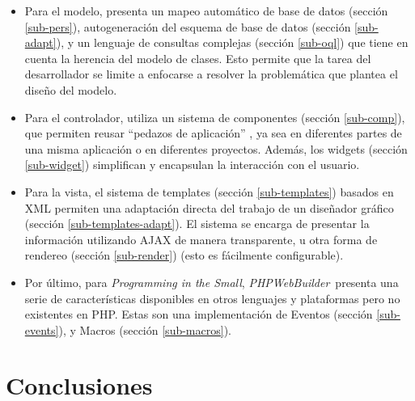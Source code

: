 \documentclass[a4paper,10pt,draft]{article}
\newcommand{\PITS}{\emph{Programming in the Small}} %
\newcommand{\PWB}{\emph{PHPWebBuilder}}
\begin{document}
\begin{itemize}
\item Para el modelo, presenta un mapeo automático de base de datos (sección \ref{sub-pers}), autogeneración del esquema de base de datos (sección \ref{sub-adapt}), y un lenguaje de consultas complejas (sección \ref{sub-oql}) que tiene en cuenta la herencia del modelo de clases.  Esto permite que la tarea del desarrollador se limite a enfocarse a resolver la problemática que plantea el diseño del modelo.

\item Para el controlador, utiliza un sistema de componentes (sección \ref{sub-comp}), que permiten reusar ``pedazos de aplicación'' , ya sea en diferentes partes de una misma aplicación o en diferentes proyectos. Además, los widgets (sección \ref{sub-widget}) simplifican y encapsulan la interacción con el usuario.

\item Para la vista, el sistema de templates (sección \ref{sub-templates}) basados en XML permiten una adaptación directa del trabajo de un diseñador gráfico (sección \ref{sub-templates-adapt}). El sistema se encarga de presentar la información utilizando AJAX de manera transparente, u otra forma de rendereo (sección \ref{sub-render}) (esto es fácilmente configurable).

\item Por último, para \PITS, \PWB \ presenta una serie de características disponibles en otros lenguajes y plataformas pero no existentes en PHP. Estas son una implementación de Eventos (sección \ref{sub-events}),
y Macros (sección \ref{sub-macros}).

\end{itemize}






\section{Conclusiones}
\end{document}
